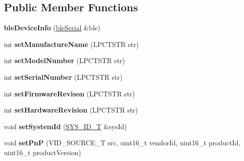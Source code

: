 \subsection*{Public Member Functions}
\begin{DoxyCompactItemize}
\item 
\hypertarget{classble_device_info_ae5f10713f4db98be9245aff3d482d51d}{{\bfseries ble\-Device\-Info} (\hyperlink{classble_serial}{ble\-Serial} \&ble)}\label{classble_device_info_ae5f10713f4db98be9245aff3d482d51d}

\item 
\hypertarget{classble_device_info_a98d7f5689f1e769f396282e3511edb99}{int {\bfseries set\-Manufacture\-Name} (L\-P\-C\-T\-S\-T\-R str)}\label{classble_device_info_a98d7f5689f1e769f396282e3511edb99}

\item 
\hypertarget{classble_device_info_a9e6a9696bb974ba0175968b3057e68d0}{int {\bfseries set\-Model\-Number} (L\-P\-C\-T\-S\-T\-R str)}\label{classble_device_info_a9e6a9696bb974ba0175968b3057e68d0}

\item 
\hypertarget{classble_device_info_a03fce5e655451a1245643987ca15ba71}{int {\bfseries set\-Serial\-Number} (L\-P\-C\-T\-S\-T\-R str)}\label{classble_device_info_a03fce5e655451a1245643987ca15ba71}

\item 
\hypertarget{classble_device_info_a0e8825ee5d745fafdca6525fa2c230e7}{int {\bfseries set\-Firmware\-Revison} (L\-P\-C\-T\-S\-T\-R str)}\label{classble_device_info_a0e8825ee5d745fafdca6525fa2c230e7}

\item 
\hypertarget{classble_device_info_aa2a08fe14dd55d02255719a1d29a484f}{int {\bfseries set\-Hardware\-Revision} (L\-P\-C\-T\-S\-T\-R str)}\label{classble_device_info_aa2a08fe14dd55d02255719a1d29a484f}

\item 
\hypertarget{classble_device_info_a372ab0246f7e19548fcef771e06dc407}{void {\bfseries set\-System\-Id} (\hyperlink{struct_s_y_s___i_d___t}{S\-Y\-S\-\_\-\-I\-D\-\_\-\-T} \&sys\-Id)}\label{classble_device_info_a372ab0246f7e19548fcef771e06dc407}

\item 
\hypertarget{classble_device_info_a344d50adf41337464686f926c8c85748}{void {\bfseries set\-Pn\-P} (V\-I\-D\-\_\-\-S\-O\-U\-R\-C\-E\-\_\-\-T src, uint16\-\_\-t vendor\-Id, uint16\-\_\-t product\-Id, uint16\-\_\-t product\-Version)}\label{classble_device_info_a344d50adf41337464686f926c8c85748}

\end{DoxyCompactItemize}
